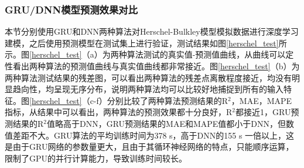 \subsubsection{GRU/DNN模型预测效果对比}

本节分别使用GRU和DNN两种算法对Herschel-Bulkley模型模拟数据进行深度学习建模，之后使用预测模型在测试集上进行验证，测试结果如图\ref{herschel_test}所示。图\ref{herschel_test}（a）为两种算法测试的真实值-预测值曲线，从曲线可以定性看出两种算法的预测值曲线与真实值曲线都非常接近。图\ref{herschel_test}（b）为两种算法测试结果的残差图，可以看出两种算法的残差点离散程度接近，均没有明显趋向性，均呈现无序分布，说明两种算法均可以比较好地捕捉到所有的输入特征。图\ref{herschel_test}（c-f）分别比较了两种算法预测结果的R$^2$，MAE，MAPE指标，从结果中可以看出，两种算法的预测效果都十分良好，R$^2$都接近1，GRU预测结果的R$^2$值略高于DNN，GRU预测结果的MAE和MAPE值都小于DNN，但数值差距不大。GRU算法的平均训练时间为378 s，高于DNN的155 s 一倍以上，这是由于GRU网络的参数量更大，且由于其循环神经网络的特点，只能顺序运算，限制了GPU的并行计算能力，导致训练时间较长。

